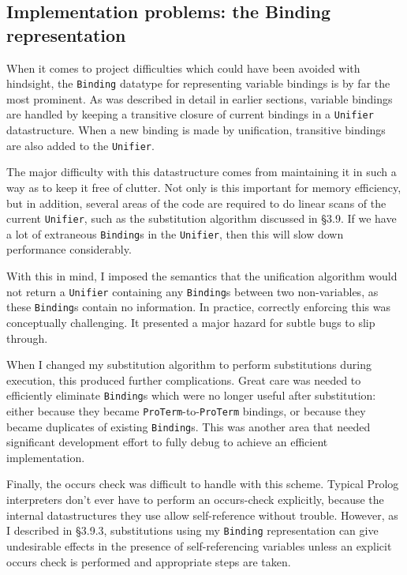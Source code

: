 \documentclass[12pt]{article}
\begin{document}
\subsection{Implementation problems: the Binding representation}

When it comes to project difficulties which could have been avoided with hindsight, the \verb|Binding| datatype for representing variable bindings is by far the most prominent. 
As was described in detail in earlier sections, variable bindings are handled by keeping a transitive closure of current bindings in a \verb|Unifier| datastructure. 
When a new binding is made by unification, transitive bindings are also added to the \verb|Unifier|.

The major difficulty with this datastructure comes from maintaining it in such a way as to keep it free of clutter. 
Not only is this important for memory efficiency, but in addition, several areas of the code are required to do linear scans of the current \verb|Unifier|, such as the substitution algorithm discussed in \S3.9. 
If we have a lot of extraneous \verb|Binding|s in the \verb|Unifier|, then this will slow down performance considerably.

With this in mind, I imposed the semantics that the unification algorithm would not return a \verb|Unifier| containing any \verb|Binding|s between two non-variables, as these \verb|Binding|s contain no information. 
In practice, correctly enforcing this was conceptually challenging. 
It presented a major hazard for subtle bugs to slip through. 

When I changed my substitution algorithm to perform substitutions during execution, this produced further complications. 
Great care was needed to efficiently eliminate \verb|Binding|s which were no longer useful after substitution: either because they became \verb|ProTerm|-to-\verb|ProTerm| bindings, or because they became duplicates of existing \verb|Binding|s. 
This was another area that needed significant development effort to fully debug to achieve an efficient implementation.

Finally, the occurs check was difficult to handle with this scheme. 
Typical Prolog interpreters don't ever have to perform an occurs-check explicitly, because the internal datastructures they use allow self-reference without trouble.
However, as I described in \S3.9.3, substitutions using my \verb|Binding| representation can give undesirable effects in the presence of self-referencing variables unless an explicit occurs check is performed and appropriate steps are taken.
\end{document}
